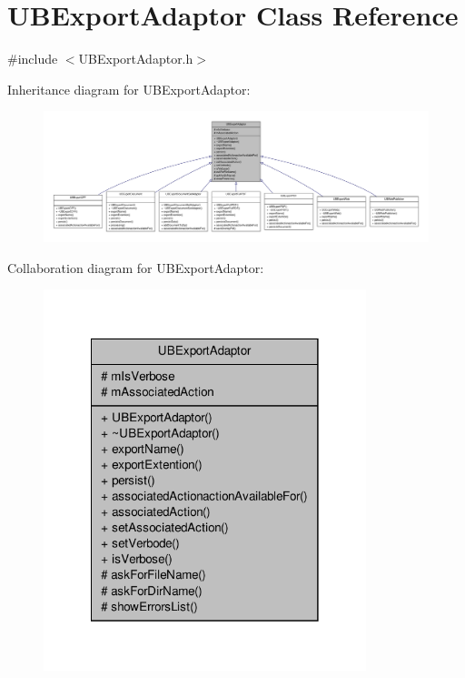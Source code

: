 \hypertarget{class_u_b_export_adaptor}{\section{U\-B\-Export\-Adaptor Class Reference}
\label{d8/dd5/class_u_b_export_adaptor}
}


{\ttfamily \#include $<$U\-B\-Export\-Adaptor.\-h$>$}



Inheritance diagram for U\-B\-Export\-Adaptor\-:
\nopagebreak
\begin{figure}[H]
\begin{center}
\leavevmode
\includegraphics[width=350pt]{df/dde/class_u_b_export_adaptor__inherit__graph}
\end{center}
\end{figure}


Collaboration diagram for U\-B\-Export\-Adaptor\-:
\nopagebreak
\begin{figure}[H]
\begin{center}
\leavevmode
\includegraphics[width=266pt]{d8/db6/class_u_b_export_adaptor__coll__graph}
\end{center}
\end{figure}
